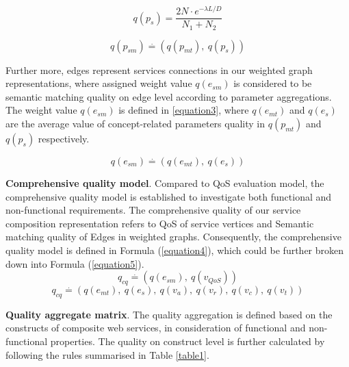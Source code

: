 \documentclass{llncs}
\begin{document}
\begin{equation}
q(p_ {s}){=} \frac{2N \cdot e^{-\lambda L/D} }{N_{1}+N_{2}}
\label{equation1}
\end{equation}

\begin{equation}
\label{equation2}
q(p_{sm}) \stackrel{.}{=} (q(p_ {mt}), \  q(p_ {s}))
\end{equation}

Further more, edges represent services connections in our weighted graph representations, where assigned weight value $q(e_{sm})$ is considered to be semantic matching quality on edge level according to parameter aggregations. The weight value $q(e_{sm})$ is defined in \ref{equation3}, where $q(e_ {mt})$ and $q(e_ {s})$ are the average value of concept-related parameters quality in $q(p_{mt})$ and $q(p_{s})$ respectively. 

\begin{equation}
\label{equation3}
q(e_{sm}) \stackrel{.}{=} (q(e_ {mt}), \  q(e_ {s}))
\end{equation}

\textbf{Comprehensive quality model}. Compared to QoS evaluation model, the comprehensive quality model is established to investigate both functional and non-functional requirements. The comprehensive quality of our service composition representation refers to QoS of service vertices and Semantic matching quality of Edges in weighted graphs. Consequently, the comprehensive quality model is defined in Formula (\ref{equation4}), which could be further broken down into Formula (\ref{equation5}). 
\begin{equation}
\label{equation4}
q_{cq} \stackrel{.}{=} (q(e_ {sm}), \  q(v_ {QoS}))
\end{equation}
\begin{equation}
\label{equation5}
q_{cq} \stackrel{.}{=} (q(e_ {mt}), \  q(e_ {s}), \  q(v_{a}),\  q(v_{r}),\  q(v_{c}),\  q(v_{t}))
\end{equation}

\textbf{Quality aggregate matrix}. The quality aggregation is defined based on the constructs of composite web services, in consideration of functional and non-functional properties. The quality on construct level is further calculated by following the rules summarised in Table \ref{table1}. 
\end{document}
